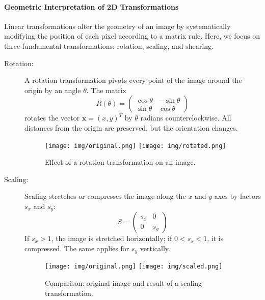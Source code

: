 \documentclass{article}
\begin{document}
\paragraph{Geometric Interpretation of 2D Transformations}

Linear transformations alter the geometry of an image by systematically modifying the position of each pixel according to a matrix rule. Here, we focus on three fundamental transformations: rotation, scaling, and shearing.

\begin{description}
    \item[Rotation:] A rotation transformation pivots every point of the image around the origin by an angle $\theta$. The matrix
    \[
    R(\theta) = \begin{pmatrix}
        \cos\theta & -\sin\theta \\
        \sin\theta & \cos\theta
    \end{pmatrix}
    \]
    rotates the vector $\mathbf{x} = (x, y)^T$ by $\theta$ radians counterclockwise. All distances from the origin are preserved, but the orientation changes.

    \begin{figure}[h]
        \centering
        \texttt{[image: img/original.png]}
        \hspace{0.5em}
        \texttt{[image: img/rotated.png]}
        \caption{Effect of a rotation transformation on an image.}
        \label{fig:rotation_example}
    \end{figure}

    \item[Scaling:] Scaling stretches or compresses the image along the $x$ and $y$ axes by factors $s_x$ and $s_y$:
    \[
    S = \begin{pmatrix}
        s_x & 0 \\
        0 & s_y
    \end{pmatrix}
    \]
    If $s_x > 1$, the image is stretched horizontally; if $0 < s_x < 1$, it is compressed. The same applies for $s_y$ vertically.

    \begin{figure}[h]
        \centering
        \texttt{[image: img/original.png]}
        \hspace{0.5em}
        \texttt{[image: img/scaled.png]}
        \caption{Comparison: original image and result of a scaling transformation.}
        \label{fig:scaling_example}
    \end{figure}


\end{description}
\end{document}
